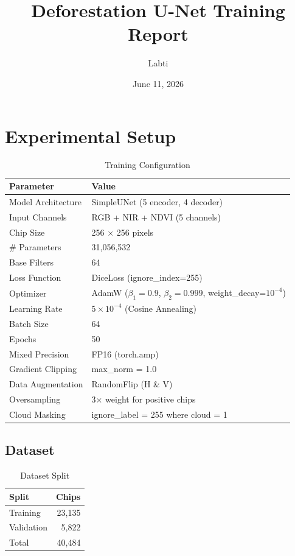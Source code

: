 \documentclass[11pt,a4paper]{article}
\title{Deforestation U-Net Training Report}
\author{Labti}
\date{June 11, 2026}
\begin{document}
\maketitle

\section{Experimental Setup}

\begin{table}[h]
\centering
\caption{Training Configuration}
\begin{tabular}{ll}
\toprule
\textbf{Parameter} & \textbf{Value} \\
\midrule
Model Architecture & SimpleUNet (5 encoder, 4 decoder) \\
Input Channels & RGB + NIR + NDVI (5 channels) \\
Chip Size & 256 $\times$ 256 pixels \\
\# Parameters & 31,056,532 \\
Base Filters & 64 \\
Loss Function & DiceLoss (ignore\_index=255) \\
Optimizer & AdamW ($\beta_1=0.9$, $\beta_2=0.999$, weight\_decay=$10^{-4}$) \\
Learning Rate & $5 \times 10^{-4}$ (Cosine Annealing) \\
Batch Size & 64 \\
Epochs & 50 \\
Mixed Precision & FP16 (torch.amp) \\
Gradient Clipping & max\_norm = 1.0 \\
Data Augmentation & RandomFlip (H \& V) \\
Oversampling & 3$\times$ weight for positive chips \\
Cloud Masking & ignore\_label = 255 where cloud = 1 \\
\bottomrule
\end{tabular}
\end{table}

\subsection{Dataset}

\begin{table}[h]
\centering
\caption{Dataset Split}
\begin{tabular}{lr}
\toprule
\textbf{Split} & \textbf{Chips} \\
\midrule
Training & 23,135 \\
Validation & 5,822 \\
Total & 40,484 \\
\bottomrule
\end{tabular}
\end{table}
\end{document}
